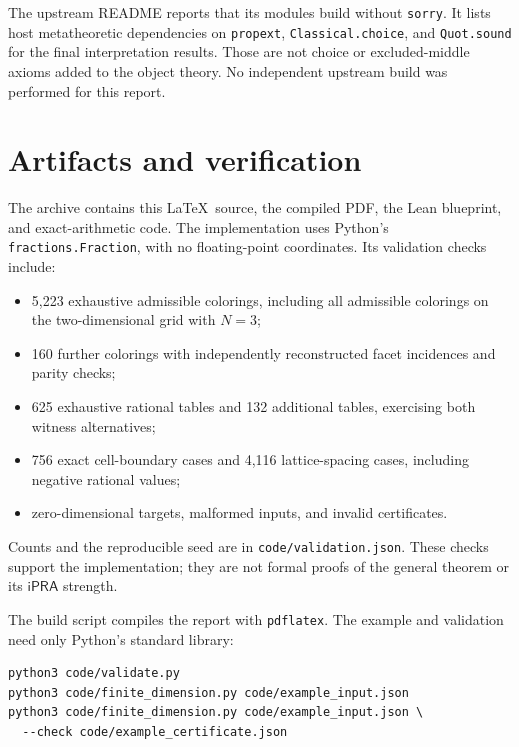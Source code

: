 \documentclass[11pt,a4paper]{article}
\theoremstyle{definition}
\newcommand{\ipra}{\mathsf{iPRA}}
\begin{document}
The upstream README reports that its modules build without
\texttt{sorry}. It lists host metatheoretic dependencies on
\texttt{propext}, \texttt{Classical.choice}, and \texttt{Quot.sound}
for the final interpretation results.
Those are not choice or excluded-middle axioms added
to the object theory. No independent upstream build
was performed for this report.

\section{Artifacts and verification}
The archive contains this \LaTeX\ source, the compiled
PDF, the Lean blueprint, and exact-arithmetic code.
The implementation uses Python's
\texttt{fractions.Fraction}, with no floating-point
coordinates. Its validation checks include:
\begin{itemize}
\item 5,223 exhaustive admissible colorings, including all
admissible colorings on the two-dimensional grid with $N=3$;
\item 160 further colorings with independently reconstructed
facet incidences and parity checks;
\item 625 exhaustive rational tables and 132 additional
tables, exercising both witness alternatives;
\item 756 exact cell-boundary cases and 4,116 lattice-spacing
cases, including negative rational values;
\item zero-dimensional targets, malformed inputs, and
invalid certificates.
\end{itemize}
Counts and the reproducible seed are in
\texttt{code/validation.json}. These checks support the
implementation; they are not formal proofs of the
general theorem or its $\ipra$ strength.

The build script compiles the report with \texttt{pdflatex}.
The example and validation need only Python's standard library:
\begin{lstlisting}
python3 code/validate.py
python3 code/finite_dimension.py code/example_input.json
python3 code/finite_dimension.py code/example_input.json \
  --check code/example_certificate.json
\end{lstlisting}

\appendix
\end{document}
